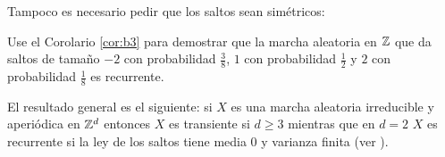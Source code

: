 Tampoco es necesario pedir que los saltos sean simétricos:

\begin{exer}
Use el Corolario \ref{cor:b3} para demostrar que la marcha aleatoria en $\mathbb{Z}$ que da saltos de tamaño $-2$ con probabilidad $\frac38$, $1$ con probabilidad $\frac12$ y $2$ con probabilidad $\frac18$ es recurrente.
\end{exer}

El resultado general es el siguiente: si $X$ es una marcha aleatoria irreducible y aperiódica en $\mathbb{Z}^d$ entonces $X$ es transiente si $d\geq3$ mientras que en $d=2$ $X$ es recurrente si la ley de los saltos tiene media $0$ y varianza finita (ver \cite[Teo. 4.1.1]{lawler-limic}).
